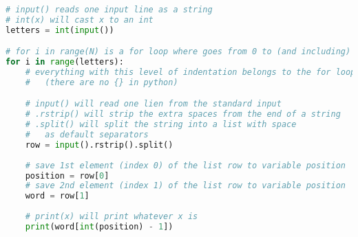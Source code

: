 \documentclass[10pt,a4paper]{article}
\begin{document}
\newpage

\begin{lstlisting}[language=Python]
# input() reads one input line as a string
# int(x) will cast x to an int
letters = int(input())

# for i in range(N) is a for loop where goes from 0 to (and including) N-1
for i in range(letters):
	# everything with this level of indentation belongs to the for loop 
	# 	(there are no {} in python)

	# input() will read one lien from the standard input
	# .rstrip() will strip the extra spaces from the end of a string
	# .split() will split the string into a list with space 
	# 	as default separators
	row = input().rstrip().split()
	
	# save 1st element (index 0) of the list row to variable position
	position = row[0]
	# save 2nd element (index 1) of the list row to variable position
	word = row[1]
    
    # print(x) will print whatever x is
    print(word[int(position) - 1])
\end{lstlisting}
\end{document}
